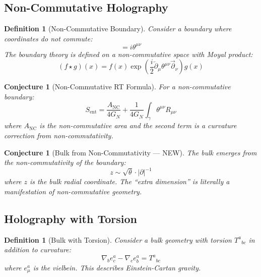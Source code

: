 \documentclass[12pt,a4paper]{article}
\newtheorem{conjecture}[theorem]{Conjecture}
\newtheorem{definition}[theorem]{Definition}
\begin{document}
\subsection{Non-Commutative Holography}

\begin{definition}[Non-Commutative Boundary]
Consider a boundary where coordinates do not commute:
\begin{equation}
[x^\mu, x^\nu] = i\theta^{\mu\nu}
\end{equation}
The boundary theory is defined on a non-commutative space with Moyal product:
\begin{equation}
(f \star g)(x) = f(x) \exp\left( \frac{i}{2} \overleftarrow{\partial}_\mu \theta^{\mu\nu} \overrightarrow{\partial}_\nu \right) g(x)
\end{equation}
\end{definition}

\begin{conjecture}[Non-Commutative RT Formula]
For a non-commutative boundary:
\begin{equation}
S_{\text{ent}} = \frac{A_{\text{NC}}}{4G_N} + \frac{1}{4G_N} \int_\gamma \theta^{\mu\nu} R_{\mu\nu}
\end{equation}
where $A_{\text{NC}}$ is the non-commutative area and the second term is a curvature correction from non-commutativity.
\end{conjecture}

\begin{conjecture}[Bulk from Non-Commutativity --- NEW]
The bulk emerges from the non-commutativity of the boundary:
\begin{equation}
z \sim \sqrt{\theta} \cdot |\partial|^{-1}
\end{equation}
where $z$ is the bulk radial coordinate. The ``extra dimension'' is literally a manifestation of non-commutative geometry.
\end{conjecture}

\subsection{Holography with Torsion}

\begin{definition}[Bulk with Torsion]
Consider a bulk geometry with torsion $T^a{}_{bc}$ in addition to curvature:
\begin{equation}
\nabla_b e^a_c - \nabla_c e^a_b = T^a{}_{bc}
\end{equation}
where $e^a_\mu$ is the vielbein. This describes Einstein-Cartan gravity.
\end{definition}
\end{document}
